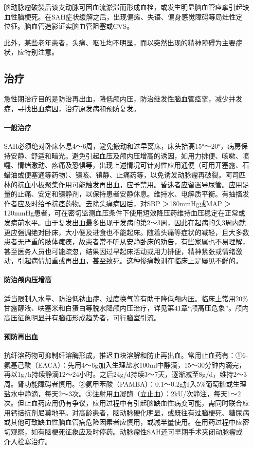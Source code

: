 脑动脉瘤破裂后该支动脉可因血流淤滞而形成血栓，或发生明显脑血管痉挛引起缺血性脑梗死。在SAH症状缓解之后，出现偏瘫、失语、偏身感觉障碍等局灶性定位征。脑血管造影证实脑血管阻塞或CVS。

此外，某些老年患者，头痛、呕吐均不明显，而以突然出现的精神障碍为主要症状，应特别注意。

\subsection{治疗}

急性期治疗目的是防治再出血，降低颅内压，防治继发性脑血管痉挛，减少并发症，寻找出血病因，治疗原发病和预防复发。

\paragraph{一般治疗}

SAH必须绝对卧床休息4～6周，避免搬动和过早离床，床头抬高15°～20°，病房保持安静、舒适和暗光。避免引起血压及颅内压增高的诱因，如用力排便、咳嗽、喷嚏、情绪激动、疼痛及恐惧等，出现上述情况可针对性应用通便（可用开塞露、石蜡油或便塞通等药物）、镇咳、镇静、止痛药等，以免诱发动脉瘤再破裂。阿司匹林的抗血小板聚集作用可能触发再出血，应予禁用。昏迷者应留置导尿管。应用足量的止痛、安定和镇静剂，以保持患者安静休息。维持水、电解质平衡。有抽搐发作者应及时给予抗痉药物。去除头痛病因后，对SBP
＞180mmHg或MAP ＞
120mmHg患者，可在密切监测血压条件下使用短效降压药维持血压稳定在正常或发病前水平。由于复发出血最多出现于发病的第2～3周，因此在起病的头3周内就更应强调绝对卧床，大小便及进食也不能起床。随着头痛等症状的减轻，且大多数患者无严重的肢体瘫痪，故患者常不听从安静卧床的劝告，有些家属也不易理解，甚至医务人员也可能疏忽，结果因过早起床活动或用力排便，精神紧张或情绪激动，引起病情加重或再出血，甚至致死。这种惨痛教训在临床上是屡见不鲜的。

\paragraph{防治颅内压增高}

适当限制入水量、防治低钠血症、过度换气等有助于降低颅内压。临床上常用20\%甘露醇液、呋塞米和白蛋白等脱水降颅内压治疗，详见第41章“颅高压危象”。颅内高压征象明显并有脑疝形成趋势者，可行脑室引流。

\paragraph{预防再出血}

抗纤溶药物可抑制纤溶酶形成，推迟血块溶解和防止再出血。常用止血药有：①6-氨基己酸（EACA）：先用4～6g加入生理盐水100ml中静滴，15～30分钟内滴完，再以1g/h持续静滴12～24小时。之后24g/d持续3～7天，逐渐减至8g/d，维持2～3周。肾功能障碍者慎用。②氨甲苯酸（PAMBA）：0.1～0.2g加入5\%葡萄糖或生理盐水中静滴，每天2～3次。③注射用血凝酶（立止血）：2kU/次静注，每天1～2次。但止血药应用仍有争议，应用过程中有引起脑缺血性病变可能，需同时联合应用钙拮抗剂尼莫地平。对高龄患者，脑动脉硬化明显，或既往有过脑梗死、糖尿病或其他可致缺血性脑血管病危险因素者应慎用，或减半量使用。在用药过程中应密切观察，如有脑梗死征象应及时停药。动脉瘤性SAH还可早期手术夹闭动脉瘤或介入栓塞治疗。

